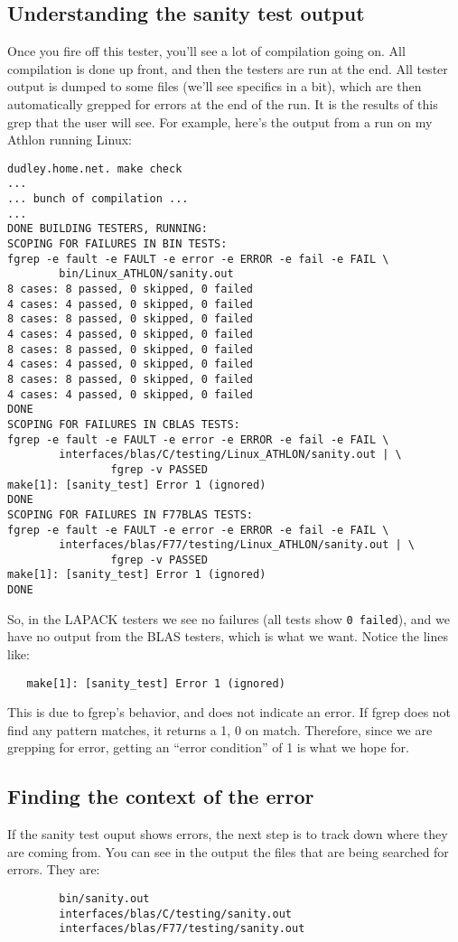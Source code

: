 \documentclass[11pt]{article}
\begin{document}
\subsection{Understanding the sanity test output}
Once you fire off this tester, you'll see a lot of compilation going on.
All compilation is done up front, and then the testers are run at the end.
All tester output is dumped to some files (we'll see specifics in a bit),
which are then automatically grepped for errors at the end of the run.  It
is the results of this grep that the user will see.  For example, here's
the output from a run on my Athlon running Linux:
\begin{verbatim}
dudley.home.net. make check
...
... bunch of compilation ...
...
DONE BUILDING TESTERS, RUNNING:
SCOPING FOR FAILURES IN BIN TESTS:
fgrep -e fault -e FAULT -e error -e ERROR -e fail -e FAIL \
        bin/Linux_ATHLON/sanity.out
8 cases: 8 passed, 0 skipped, 0 failed
4 cases: 4 passed, 0 skipped, 0 failed
8 cases: 8 passed, 0 skipped, 0 failed
4 cases: 4 passed, 0 skipped, 0 failed
8 cases: 8 passed, 0 skipped, 0 failed
4 cases: 4 passed, 0 skipped, 0 failed
8 cases: 8 passed, 0 skipped, 0 failed
4 cases: 4 passed, 0 skipped, 0 failed
DONE
SCOPING FOR FAILURES IN CBLAS TESTS:
fgrep -e fault -e FAULT -e error -e ERROR -e fail -e FAIL \
        interfaces/blas/C/testing/Linux_ATHLON/sanity.out | \
                fgrep -v PASSED
make[1]: [sanity_test] Error 1 (ignored)
DONE
SCOPING FOR FAILURES IN F77BLAS TESTS:
fgrep -e fault -e FAULT -e error -e ERROR -e fail -e FAIL \
        interfaces/blas/F77/testing/Linux_ATHLON/sanity.out | \
                fgrep -v PASSED
make[1]: [sanity_test] Error 1 (ignored)
DONE
\end{verbatim}

So, in the LAPACK testers we see no failures (all tests show 
{\tt 0 failed}), and we have no output from the BLAS testers, which is
what we want.  Notice the lines like:
\begin{verbatim}
   make[1]: [sanity_test] Error 1 (ignored)
\end{verbatim}

This is due to fgrep's behavior, and does not indicate an error.  If fgrep
does not find any pattern matches, it returns a 1, 0 on match.  Therefore,
since we are grepping for error, getting an ``error condition'' of 1 is
what we hope for.

\subsection{Finding the context of the error}
If the sanity test ouput shows errors, the next step is to track down where
they are coming from.  You can see in the output the files that are being
searched for errors.  They are:
\begin{verbatim}
        bin/sanity.out
        interfaces/blas/C/testing/sanity.out 
        interfaces/blas/F77/testing/sanity.out 
\end{verbatim}
\end{document}
